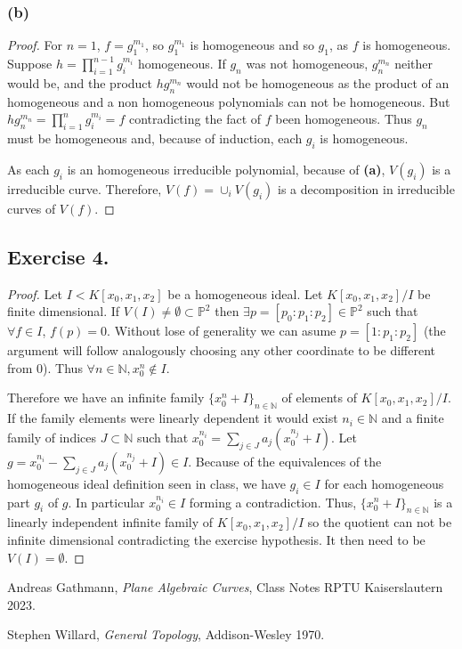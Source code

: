 \documentclass[11pt,a4paper]{article}
\begin{document}
\subsubsection*{(b)}
  \begin{proof}
    For $ n = 1 $, $ f = g_1^{m_1} $, so $ g_1^{m_1} $ is homogeneous and so $ g_1 $, as $ f $ is homogeneous. Suppose $ h = \prod_{i=1}^{n-1} g_i^{m_i} $ homogeneous. If $ g_n $ was not homogeneous, $ g_n^{m_n} $ neither would be, and the product $ h g_n^{m_n} $ would not be homogeneous as the product of an homogeneous and a non homogeneous polynomials can not be homogeneous. But $ h g_n^{m_n} = \prod_{i=1}^n g_i^{m_i} = f $ contradicting the fact of $ f $ been homogeneous. Thus $ g_n $ must be homogeneous and, because of induction, each $ g_i $ is homogeneous.

    \vspace{1mm}
    As each $ g_i $ is an homogeneous irreducible polynomial, because of {\bf (a)}, $ V(g_i) $ is a irreducible curve. Therefore, $ V(f) = \cup_i V(g_i) $ is a decomposition in irreducible curves of $ V(f) $.
  \end{proof}

\subsection*{Exercise 4.}
\begin{proof}
  Let $ I < K[x_0, x_1, x_2] $ be a homogeneous ideal. Let $ K[x_0, x_1, x_2] / I $ be finite dimensional. If $ V(I) \neq \emptyset \subset \mathbb P^2 $ then $ \exists p = [p_0: p_1: p_2] \in \mathbb P^2 $ such that $ \forall f \in I $, $ f(p) = 0 $. Without lose of generality we can asume $ p = [1: p_1: p_2] $ (the argument will follow analogously choosing any other coordinate to be different from $ 0 $). Thus $ \forall n \in \mathbb N, x_0^n \notin I $. 

  \vspace{1mm}
  Therefore we have an infinite family $ \{ x_0^n + I \}_{n \in \mathbb N} $ of elements of $ K[x_0, x_1, x_2] / I $. If the family elements were linearly dependent it would exist $ n_i \in \mathbb N $ and a finite family of indices $ J \subset \mathbb N $ such that $ x_0^{n_i} = \sum_{j \in J} a_j (x_0^{n_j} + I) $. Let $ g = x_0^{n_i} - \sum_{j \in J} a_j (x_0^{n_j} + I) \in I $. Because of the equivalences of the homogeneous ideal definition seen in class, we have $ g_i \in I $ for each homogeneous part $ g_i $ of $ g $. In particular $ x_0^{n_i} \in I $ forming a contradiction. Thus, $ \{ x_0^n + I \}_{n \in \mathbb N} $ is a linearly independent infinite family of $ K[x_0, x_1, x_2] / I $ so the quotient can not be infinite dimensional contradicting the exercise hypothesis. It then need to be $ V(I) = \emptyset $.
\end{proof}


\begin{thebibliography}{9}

  Andreas Gathmann,
  \textit{Plane Algebraic Curves},
  Class Notes RPTU Kaiserslautern 2023.

  Stephen Willard,
  \textit{General Topology},
  Addison-Wesley 1970.
  
\end{thebibliography}
\end{document}
